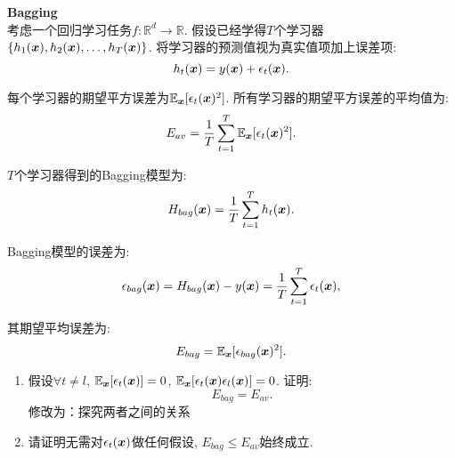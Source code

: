 \documentclass[answers]{exam}  %
\begin{document}
\begin{questions}
\question [20] \textbf{Bagging} \\
考虑一个回归学习任务$f:\mathbb{R}^d \rightarrow \mathbb{R}$. 假设已经学得$T$个学习器$\{h_1({\boldsymbol{x}}), h_2({\boldsymbol{x}}), \dots, h_T({\boldsymbol{x}})\}$. 将学习器的预测值视为真实值项加上误差项:
\begin{equation}
h_t({\boldsymbol{x}})=y({\boldsymbol{x}})+\epsilon_t({\boldsymbol{x}}).
\end{equation}

每个学习器的期望平方误差为$\mathbb{E}_{{\boldsymbol{x}}}[\epsilon_t({\boldsymbol{x}})^2]$. 所有学习器的期望平方误差的平均值为:
\begin{equation}
E_{av}=\frac{1}{T}\sum_{t=1}^T \mathbb{E}_{{\boldsymbol{x}}}[\epsilon_t({\boldsymbol{x}})^2].
\end{equation}

$T$个学习器得到的Bagging模型为:
\begin{equation}
H_{bag}({\boldsymbol{x}})=\frac{1}{T}\sum_{t=1}^T h_t({\boldsymbol{x}}).
\end{equation}

Bagging模型的误差为:
\begin{equation}
\epsilon_{bag}({\boldsymbol{x}})=H_{bag}({\boldsymbol{x}})-y({\boldsymbol{x}})=\frac{1}{T}\sum_{t=1}^T \epsilon_t({\boldsymbol{x}}),
\end{equation}

其期望平均误差为:
\begin{equation}
E_{bag}=\mathbb{E}_{{\boldsymbol{x}}}[\epsilon_{bag}({\boldsymbol{x}})^2].
\end{equation}

\begin{enumerate}
\item 假设$\forall t\neq l$, $\mathbb{E}_{{\boldsymbol{x}}}[\epsilon_t({\boldsymbol{x}})]=0$, $ \mathbb{E}_{{\boldsymbol{x}}}[\epsilon_t({\boldsymbol{x}})\epsilon_l({\boldsymbol{x}})]=0$. 证明:
\begin{equation}
E_{bag}=E_{av}.
\end{equation}
\colorbox[RGB]{255,255,0}{修改为：探究两者之间的关系}
\item 请证明无需对$\epsilon_t({\boldsymbol{x}})$做任何假设, $E_{bag}\leq E_{av}$始终成立. 
\end{enumerate}


\end{questions}
\end{document}
